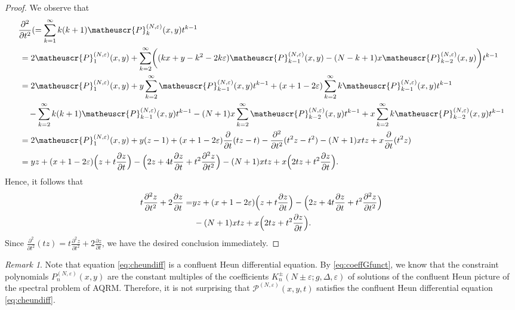 \documentclass[11pt]{article}
\numberwithin{equation}{section}
\newcommand{\e}{\varepsilon}
\newcommand{\cp}[2]{P^{(#1)}_{#2}} %
\newcommand{\ncp}[2]{\matheuscr{P}^{(#1)}_{#2}} %
\newcommand{\Gncp}[1]{\mathscr{P}^{(#1)}} %
\theoremstyle{plain}
\theoremstyle{definition}
\theoremstyle{remark}
\newtheorem{rem}{Remark}[section]
\begin{document}
\begin{proof}
  We observe that
  \small
  \begin{align*}
    &\frac{\partial^2}{\partial t^2}(=\sum_{k=1}^\infty k(k+1)\ncp{N,\e}k(x,y)t^{k-1} \\
    &\, =2\ncp{N,\e}1(x,y)+\sum_{k=2}^\infty
      \biggl(
      (kx+y-k^2-2k\e)\ncp{N,\e}{k-1}(x,y)
      -(N-k+1)x\ncp{N,\e}{k-2}(x,y)
      \biggr)t^{k-1} \\
    &\, =2\ncp{N,\e}1(x,y)
      +y\sum_{k=2}^\infty
      \ncp{N,\e}{k-1}(x,y)t^{k-1}
      +(x+1-2\e)\sum_{k=2}^\infty k\ncp{N,\e}{k-1}(x,y)t^{k-1} \\
    &\, \quad{}-\sum_{k=2}^\infty k(k+1)\ncp{N,\e}{k-1}(x,y)t^{k-1}
      -(N+1)x\sum_{k=2}^\infty\ncp{N,\e}{k-2}(x,y)t^{k-1}
      +x\sum_{k=2}^\infty k\ncp{N,\e}{k-2}(x,y)t^{k-1} \\
    &\,=2\ncp{N,\e}1(x,y)+y(z-1)+(x+1-2\e)\frac{\partial}{\partial t}(tz-t)
      -\frac{\partial^2}{\partial t^2}(t^2z-t^2)-(N+1)xtz+x\frac{\partial}{\partial t}(t^2z) \\
    &\,=yz+(x+1-2\e)\Bigl(z+t\frac{\partial z}{\partial t}\Bigr)
      -\Bigl(2z+4t\frac{\partial z}{\partial t}+t^2\frac{\partial^2 z}{\partial t^2}\Bigr)
      -(N+1)xtz+x\Bigl(2tz+t^2\frac{\partial z}{\partial t}\Bigr).
  \end{align*}
  \normalsize
  Hence, it follows that
  \begin{align*}
    t\frac{\partial^2z}{\partial t^2}+2\frac{\partial z}{\partial t} =& yz+(x+1-2\e)\Bigl(z+t\frac{\partial z}{\partial t}\Bigr)
      -\Bigl(2z+4t\frac{\partial z}{\partial t}+t^2\frac{\partial^2 z}{\partial t^2}\Bigr) \\                                       
    &\, -(N+1)xtz+x\Bigl(2tz+t^2\frac{\partial z}{\partial t}\Bigr).
  \end{align*}
  Since $\frac{\partial^2}{\partial t^2}(tz)=t\frac{\partial^2z}{\partial t^2}+2\frac{\partial z}{\partial t}$,
  we have the desired conclusion immediately. 
\end{proof}

\begin{rem}
  Note that equation \eqref{eq:cheundiff} is a confluent Heun differential equation.
  By \eqref{eq:coeffGfunct}, we know that the constraint polynomials \(\cp{N,\e}{n}(x,y)\) are
  the constant multiples of the coefficients \(K_n^{\pm}(N \pm \e;g,\Delta,\e)\) of solutions of the
  confluent Heun picture of the spectral problem of AQRM.
  Therefore, it is not surprising that \(\Gncp{N,\e}(x,y,t)\) satisfies the confluent Heun differential
  equation \eqref{eq:cheundiff}.
\end{rem}
\end{document}
